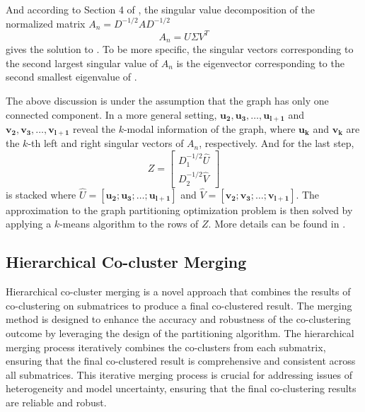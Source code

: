 And according to Section 4 of \cite{dhillon2001CoclusteringDocumentsWords}, the singular value decomposition of the normalized matrix $A_n = D^{-1/2} A D^{-1/2}$
$$A_n = U \Sigma V^T$$
gives the solution to . To be more specific, the singular vectors corresponding to the second largest singular value of $A_n$ is the eigenvector corresponding to the second smallest eigenvalue of .

The above discussion is under the assumption that the graph has only one connected component. In a more general setting, $\mathbf{u_2}, \mathbf{u_3}, \ldots, \mathbf{u_{l+1}}$ and $\mathbf{v_2}, \mathbf{v_3}, \ldots, \mathbf{v_{l+1}}$ reveal the $k$-modal information of the graph, where $\mathbf{u_k}$ and $\mathbf{v_k}$ are the $k$-th left and right singular vectors of $A_n$, respectively.
And for the last step,
$$ Z = \begin{bmatrix} D_1^{-1/2} \hat{U} \\ D_2^{-1/2} \hat{V} \end{bmatrix} $$
is stacked where $\hat{U} = [\mathbf{u_2}; \mathbf{u_3}; \ldots; \mathbf{u_{l+1}}]$ and $\hat{V} = [\mathbf{v_2}; \mathbf{v_3}; \ldots; \mathbf{v_{l+1}}]$. The approximation to the graph partitioning optimization problem is then solved by applying a $k$-means algorithm to the rows of $Z$. More details can be found in \cite{dhillon2001CoclusteringDocumentsWords}.

\subsection{Hierarchical Co-cluster Merging}

Hierarchical co-cluster merging is a novel approach that combines the results of co-clustering on submatrices to produce a final co-clustered result.
The merging method is designed to enhance the accuracy and robustness of the co-clustering outcome by leveraging the design of the partitioning algorithm. The hierarchical merging process iteratively combines the co-clusters from each submatrix, ensuring that the final co-clustered result is comprehensive and consistent across all submatrices. This iterative merging process is crucial for addressing issues of heterogeneity and model uncertainty, ensuring that the final co-clustering results are reliable and robust.

